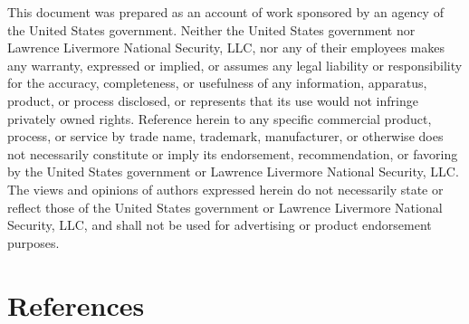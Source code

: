 \documentclass[3p]{elsarticle}
\begin{document}
\begin{spacing}{0.5}
    \tiny
    This document was prepared as an account of work sponsored
    by an agency of the United States government.
    Neither the United States government nor Lawrence Livermore National Security, LLC,
    nor any of their employees makes any warranty, expressed or implied,
    or assumes any legal liability or responsibility for the accuracy, completeness,
    or usefulness of any information, apparatus, product, or process disclosed,
    or represents that its use would not infringe privately owned rights.
    Reference herein to any specific commercial product, process,
    or service by trade name, trademark, manufacturer,
    or otherwise does not necessarily constitute or imply its endorsement, recommendation,
    or favoring by the United States government or Lawrence Livermore National Security, LLC.
    The views and opinions of authors expressed herein do not necessarily state
    or reflect those of the United States government
    or Lawrence Livermore National Security, LLC,
    and shall not be used for advertising or product endorsement purposes.
\end{spacing}
\section*{References}

\FloatBarrier
\clearpage

\renewcommand{\thesection}{SM\arabic{section}}
\setcounter{section}{0}\setcounter{subsection}{0}\setcounter{equation}{0}
\setcounter{figure}{0}
\setcounter{table}{0}
\setcounter{page}{1}
\renewcommand{\theequation}{SM\arabic{equation}}
\renewcommand{\thefigure}{SM\arabic{figure}}
\renewcommand{\bibnumfmt}[1]{[SM#1]}
\renewcommand{\citenumfont}[1]{SM#1}
\end{document}
